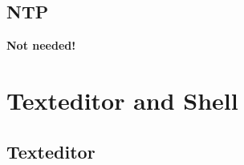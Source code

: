 \documentclass[10pt, a4paper, onecolumn, openany]{book} %
\begin{document}
\section{NTP}
\textbf{Not needed!}


\chapter{Texteditor and Shell}
\section{Texteditor}
\end{document}

